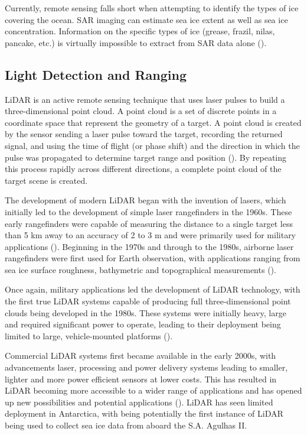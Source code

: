 Currently, remote sensing falls short when attempting to identify the types of ice covering the ocean. \ac{SAR} imaging can estimate sea ice extent as well as sea ice concentration. Information on the specific types of ice (grease, frazil, nilas, pancake, etc.) is virtually impossible to extract from \ac{SAR} data alone (\cite{zakhvatkinaSatelliteSARDatabased2019}).

\subsection{Light Detection and Ranging}
\label{subsec:ch2.section5.subsec1}

\ac{LiDAR} is an active remote sensing technique that uses laser pulses to build a three-dimensional point cloud. A point cloud is a set of discrete points in a coordinate space that represent the geometry of a target. A point cloud is created by the sensor sending a laser pulse toward the target, recording the returned signal, and using the time of flight (or phase shift) and the direction in which the pulse was propagated to determine target range and position (\cite{kukkoMobileLaserScanning2013}). By repeating this process rapidly across different directions, a complete point cloud of the target scene is created.

The development of modern \ac{LiDAR} began with the invention of lasers, which initially led to the development of simple laser rangefinders in the 1960s. These early rangefinders were capable of measuring the distance to a single target less than 5 km away to an accuracy of 2 to 3 m and were primarily used for military applications (\cite{molebnyLaserRadarHistorical2016}). Beginning in the 1970s and through to the 1980s, airborne laser rangefinders were first used for Earth observation, with applications ranging from sea ice surface roughness, bathymetric and topographical measurements (\cite{nelsonHowDidWe2013}).

Once again, military applications led the development of \ac{LiDAR} technology, with the first true \ac{LiDAR} systems capable of producing full three-dimensional point clouds being developed in the 1980s. These systems were initially heavy, large and required significant power to operate, leading to their deployment being limited to large, vehicle-mounted platforms (\cite{molebnyLaserRadarHistorical2016}).  

Commercial \ac{LiDAR} systems first became available in the early 2000s, with advancements laser, processing and power delivery systems leading to smaller, lighter and more power efficient sensors at lower costs. This has resulted in \ac{LiDAR} becoming more accessible to a wider range of applications and has opened up new possibilities and potential applications (\cite{wangEvolutionLiDARIts2020}). \ac{LiDAR} has seen limited deployment in Antarctica, with \cite{sandruShipborneSeaiceField2021} being potentially the first instance of \ac{LiDAR} being used to collect sea ice data from aboard the S.A. Agulhas II.


